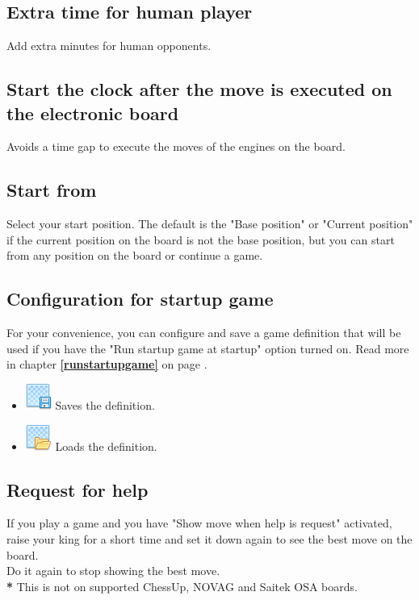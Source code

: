 \documentclass[11pt,a4paper]{article}
\begin{document}
\subsection{Extra time for human player}
Add extra minutes for human opponents.

\subsection{Start the clock after the move is executed on the electronic board}
Avoids a time gap to execute the moves of the engines on the board.


\subsection{Start from}
Select your start position. The default is the "Base position" or "Current position" if the current position on the board is not the base position, but you can start from any position on the board or continue a game.



\subsection{Configuration for startup game} \label{startupgame}

For your convenience, you can configure and save a game definition that will be used if you have the "Run startup game at startup" option turned on.  Read more in chapter \textbf{\ref{runstartupgame}  } on page \pageref{runstartupgame}.

\begin{itemize}
	  \item \includegraphics[scale=0.5]{layer_save.png} Saves the definition.
  	  \item \includegraphics[scale=0.5]{layer_open.png} Loads the definition.
\end{itemize}


\subsection{Request for help}
If you play a game and you have "Show move when help is request" activated, raise your king for a short time and set it down again to see the best move on the board.\\
Do it again to stop showing the best move.\\
{\color{red}\textbf{*}} This is not on supported ChessUp, NOVAG and Saitek OSA boards.
\end{document}
